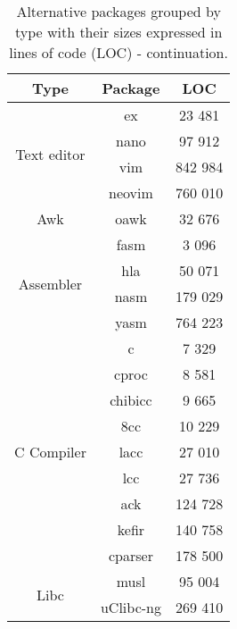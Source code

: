 \begin{table}[!ht]
    \centering
    \begin{tabular}{|c|c|c|}
        \hline
        Type & Package & LOC \\
        \hline
        \hline
        \multirow{4}{*}{Text editor}
        & ex \cite{ex-vi} \footnotemark & 23 481 \\
        \cline{2-3}
        & nano \cite{nano} & 97 912 \\
        \cline{2-3}
        & vim \cite{vim} & 842 984 \\
        \cline{2-3}
        & neovim \cite{neovim} & 760 010 \\
        \hline
        \hline
        Awk & oawk \cite{oawk} & 32 676 \\
        \hline
        \hline
        \multirow{4}{*}{Assembler}
        & fasm \cite{fasm} & 3 096 \\
        \cline{2-3}
        & hla \cite{hla} & 50 071 \\
        \cline{2-3}
        & nasm \cite{nasm} & 179 029 \\
        \cline{2-3}
        & yasm \cite{yasm} & 764 223 \\
        \hline
        \hline
        \multirow{9}{*}{C Compiler}
        & c \cite{c} & 7 329 \\
        \cline{2-3}
        & cproc \cite{cproc} & 8 581 \\
        \cline{2-3}
        & chibicc \cite{chibicc} & 9 665 \\
        \cline{2-3}
        & 8cc \cite{8cc} & 10 229 \\
        \cline{2-3}
        & lacc \cite{lacc} & 27 010 \\
        \cline{2-3}
        & lcc \cite{lcc} \footnotemark & 27 736 \\
        \cline{2-3}
        & ack \cite{ack} & 124 728 \\
        \cline{2-3}
        & kefir \cite{kefir} & 140 758 \\
        \cline{2-3}
        & cparser \cite{cparser} & 178 500 \\
        \hline
        \hline
        \multirow{2}{*}{Libc}
        & musl \cite{musl} & 95 004 \\
        \cline{2-3}
        & uClibc-ng \cite{uclibc-ng} & 269 410 \\
        \hline
    \end{tabular}
    \caption{Alternative packages grouped by type with their sizes expressed in lines of code (LOC) - continuation.}
\end{table}

